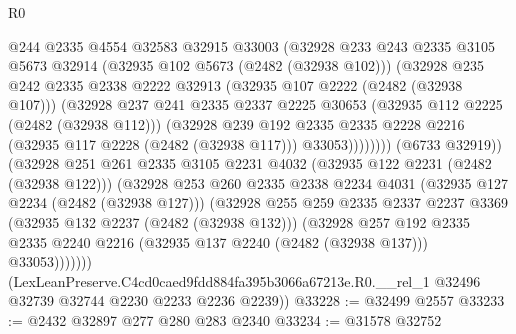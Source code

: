 \begin{lexlean}{R0}
\begin{coremodule}
                      @244
                      @2335
                      @4554
                      @32583
                      @32915
                      @33003
                      (@32928
                        @233
                        @243
                        @2335
                        @3105
                        @5673
                        @32914
                        (@32935 @102 @5673 (@2482 (@32938 @102)))
                        (@32928
                          @235
                          @242
                          @2335
                          @2338
                          @2222
                          @32913
                          (@32935 @107 @2222 (@2482 (@32938 @107)))
                          (@32928
                            @237
                            @241
                            @2335
                            @2337
                            @2225
                            @30653
                            (@32935 @112 @2225 (@2482 (@32938 @112)))
                            (@32928
                              @239
                              @192
                              @2335
                              @2335
                              @2228
                              @2216
                              (@32935 @117 @2228 (@2482 (@32938 @117)))
                              @33053))))))))
              (@6733 @32919))
            (@32928
              @251
              @261
              @2335
              @3105
              @2231
              @4032
              (@32935 @122 @2231 (@2482 (@32938 @122)))
              (@32928
                @253
                @260
                @2335
                @2338
                @2234
                @4031
                (@32935 @127 @2234 (@2482 (@32938 @127)))
                (@32928
                  @255
                  @259
                  @2335
                  @2337
                  @2237
                  @3369
                  (@32935 @132 @2237 (@2482 (@32938 @132)))
                  (@32928
                    @257
                    @192
                    @2335
                    @2335
                    @2240
                    @2216
                    (@32935 @137 @2240 (@2482 (@32938 @137)))
                    @33053)))))))
      (LexLeanPreserve.C4cd0caed9fdd884fa395b3066a67213e.R0.__rel_1
        @32496
        @32739
        @32744
        @2230
        @2233
        @2236
        @2239))
@33228 := @32499 @2557
@33233 := @2432 @32897 @277 @280 @283 @2340
@33234 := @31578 @32752

\end{coremodule}
\end{lexlean}

